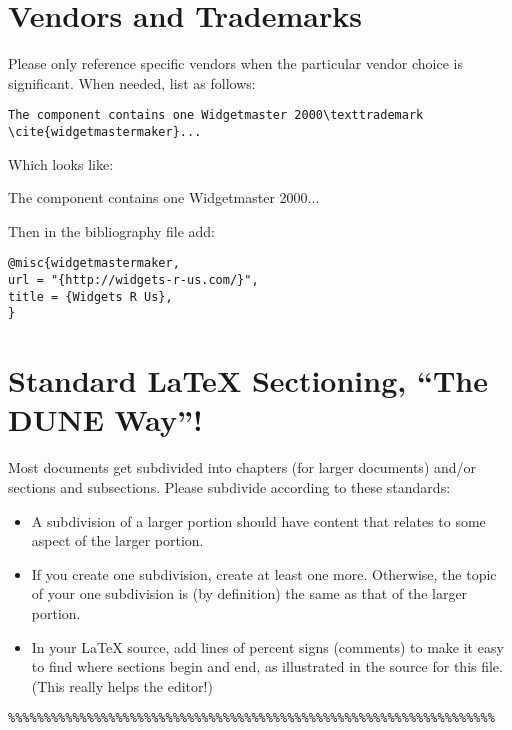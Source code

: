 \section{Vendors and Trademarks}
\label{sec:trademarks}

Please only reference specific vendors when the particular vendor choice is significant.  When needed,
list as follows:

\begin{verbatim}
The component contains one Widgetmaster 2000\texttrademark \cite{widgetmastermaker}...
\end{verbatim}
Which looks like:

The component contains one Widgetmaster 2000\texttrademark \cite{widgetmastermaker}...


Then in the bibliography file add:
\begin{verbatim}
@misc{widgetmastermaker,
url = "{http://widgets-r-us.com/}",
title = {Widgets R Us},
}
\end{verbatim}
\section{Standard \LaTeX{} Sectioning, ``The DUNE Way''!}
\label{sec:latex-sectioning}

Most documents get subdivided into chapters (for larger documents) and/or sections and subsections. Please subdivide according to these standards:

\begin{itemize}
\item A subdivision of a larger portion should have content that relates to some aspect of the larger portion. 
\item  If you create one subdivision, create at least one more. Otherwise, the topic of your one subdivision is (by definition) the same as that of the larger portion.
\item In your \LaTeX{} source, add lines of percent signs (comments) to make it easy to find where sections begin and end, as illustrated in the source for this file. (This really helps the editor!)
\end{itemize}

\begin{verbatim}
%%%%%%%%%%%%%%%%%%%%%%%%%%%%%%%%%%%%%%%%%%%%%%%%%%%%%%%%%%%%%%%%%%%%
\end{verbatim}

